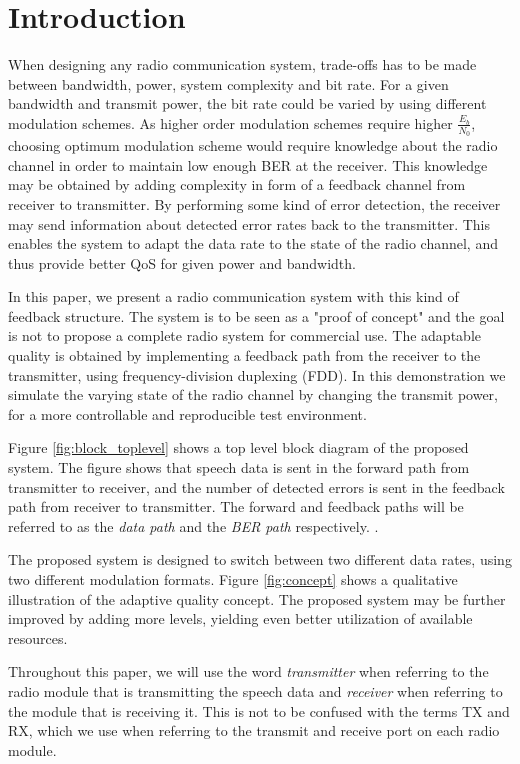 \section{Introduction}
\label{sec:Introduction}
When designing any radio communication system, trade-offs has to be made between bandwidth, power, system complexity and bit rate. For a given bandwidth and transmit power, the bit rate could be varied by using different modulation schemes. As higher order modulation schemes require higher $\frac{E_b}{N_0}$, choosing optimum modulation scheme would require knowledge about the radio channel in order to maintain low enough BER at the receiver. This knowledge may be obtained by adding complexity in form of a feedback channel from receiver to transmitter. By performing some kind of error detection, the receiver may send information about detected error rates back to the transmitter. This enables the system to adapt the data rate to the state of the radio channel, and thus provide better QoS for given power and bandwidth. 

In this paper, we present a radio communication system with this kind of feedback structure. The system is to be seen as a "proof of concept" and the goal is not to propose a complete radio system for commercial use. The adaptable quality is obtained by implementing a feedback path from the receiver to the transmitter, using frequency-division duplexing (FDD). In this demonstration we simulate the varying state of the radio channel by changing the transmit power, for a more controllable and reproducible test environment.

Figure \ref{fig:block_toplevel} shows a top level block diagram of the proposed system. The figure shows that speech data is sent in the forward path from transmitter to receiver, and the number of detected errors is sent in the feedback path from receiver to transmitter. The forward and feedback paths will be referred to as the \textit{data path} and the \textit{BER path} respectively. 
. 

The proposed system is designed to switch between two different data rates, using two different modulation formats. Figure \ref{fig:concept} shows a qualitative illustration of the adaptive quality concept. The proposed system may be further improved by adding more levels, yielding even better utilization of available resources. 



Throughout this paper, we will use the word \textit{transmitter} when referring to the radio module that is transmitting the speech data and \textit{receiver} when referring to the module that is receiving it. This is not to be confused with the terms TX and RX, which we use when referring to the transmit and receive port on each radio module. 

